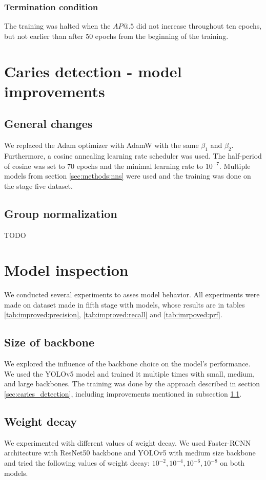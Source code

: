 \subsubsection{Termination condition}
The training was halted when the $AP@.5$ did not increase throughout ten epochs, but not earlier than after 50 epochs from the beginning of the training.

\section{Caries detection - model improvements}
\subsection{General changes}
\label{sec:general_changes}
We replaced the Adam optimizer with AdamW with the same $\beta_1$ and $\beta_2$. Furthermore, a cosine annealing learning rate scheduler was used. The half-period of cosine was set to 70 epochs and the minimal learning rate to $10^{-7}$.
Multiple models from section \ref{sec:methods:nns} were used and the training was done on the stage five dataset.
\subsection{Group normalization}
TODO

\section{Model inspection}
\label{sec:model_inspection}
We conducted several experiments to asses model behavior. All experiments were made on dataset made in fifth stage with models, whose results are in tables \ref{tab:improved:precision}, \ref{tab:improved:recall} and \ref{tab:imrpoved:prf}.

\subsection{Size of backbone}
We explored the influence of the backbone choice on the model's performance. We used the YOLOv5 model and trained it multiple times with small, medium, and large backbones. The training was done by the approach described in section \ref{sec:caries_detection}, including improvements mentioned in subsection \ref{sec:general_changes}.

\subsection{Weight decay}
We experimented with different values of weight decay. We used Faster-RCNN architecture with ResNet50 backbone and YOLOv5 with medium size backbone and tried the following values of weight decay: $10^{-2}, 10^{-4}, 10^{-6}, 10^{-8}$ on both models.

